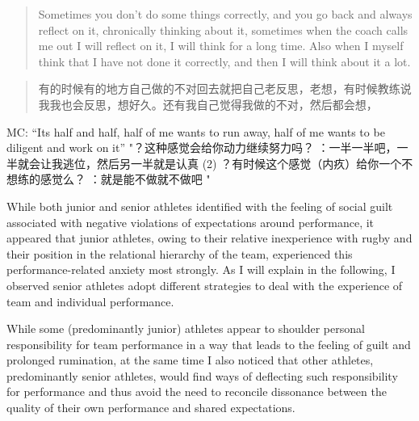 \begin{CJK}{UTF8}{gbsn}
      \begin{quotation}
        Sometimes you don't do some things correctly, and you go back and always reflect on it, chronically thinking about it, sometimes when the coach calls me out I will reflect on it, I will think for a long time. Also when I myself think that I have not done it correctly, and then I will think about it a lot.
      \end{quotation}

      \begin{quotation}
        有的时候有的地方自己做的不对回去就把自己老反思，老想，有时候教练说我我也会反思，想好久。还有我自己觉得我做的不对，然后都会想，
      \end{quotation}

MC:
“Its half and half, half of me wants to run away, half of me wants to be diligent and work on it”	"？这种感觉会给你动力继续努力吗？
：一半一半吧，一半就会让我逃位，然后另一半就是认真 (2) ？有时候这个感觉（内疚）给你一个不想练的感觉么？
：就是能不做就不做吧
"


While both junior and senior athletes identified with the feeling of social guilt associated with negative violations of expectations around performance, it appeared that junior athletes, owing to their relative inexperience with rugby and their position in the relational hierarchy of the team, experienced this performance-related anxiety most strongly.  As I will explain in the following, I observed senior athletes adopt different strategies to deal with the experience of team and individual performance.


While some (predominantly junior) athletes appear to shoulder personal responsibility for team performance in a way that leads to the feeling of guilt and prolonged rumination, at the same time I also noticed that other athletes, predominantly senior athletes, would find ways of deflecting such responsibility for performance and thus avoid the need to reconcile dissonance between the quality of their own performance and shared expectations.


\end{CJK}
